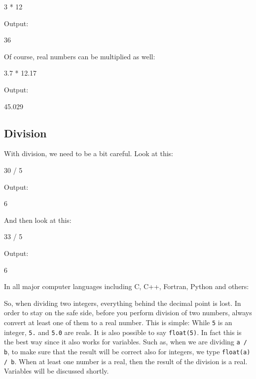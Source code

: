 \begin{bluecode}
3 * 12
\end{bluecode}
Output:

\begin{greencode}
36
\end{greencode}
Of course, real numbers can be multiplied as well:

\begin{bluecode}
3.7 * 12.17
\end{bluecode}
Output:

\begin{greencode}
45.029
\end{greencode}
\subsection{Division}
With division, we need to be a bit careful. Look at this:

\begin{bluecode}
30 / 5
\end{bluecode}
Output:

\begin{greencode}
6
\end{greencode}
And then look at this:

\begin{bluecode}
33 / 5
\end{bluecode}
Output:

\begin{greencode}
6
\end{greencode}
In all major computer languages including C, C++, Fortran, Python and 
others:\\

\begin{center}
\end{center}

\vspace{4mm}
\noindent
So, when dividing two integers, everything behind the decimal point is lost.
In order to stay on the safe side, 
before you perform division of two numbers, always convert at least one of them
to a real number. This is simple: While {\tt 5} is an integer, {\tt 5.}
and {\tt 5.0} are reals. It is also possible to 
say {\tt float(5)}. In fact this is the best way since it also works for 
variables. Such as, when we are dividing {\tt a / b}, to make sure that 
the result will be correct also for integers, we type {\tt float(a) / b}. 
When at least one number is a real, then the result of the division is a real.   
Variables will be discussed shortly.

